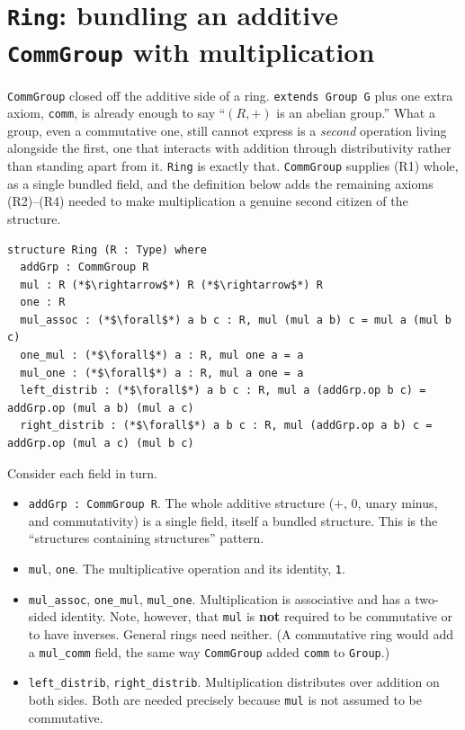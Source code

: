 \section{\texorpdfstring{\texttt{Ring}: bundling an additive \texttt{CommGroup} with multiplication}{Ring: bundling an additive CommGroup with multiplication}}\label{sec:08-rings:03-ring:1}

\texttt{CommGroup} closed off the additive side of a ring. \texttt{extends Group G} plus one extra axiom, \texttt{comm}, is already enough to say ``\((R, +)\) is an abelian group.'' What a group, even a commutative one, still cannot express is a \emph{second} operation living alongside the first, one that interacts with addition through distributivity rather than standing apart from it. \texttt{Ring} is exactly that. \texttt{CommGroup} supplies (R1) whole, as a single bundled field, and the definition below adds the remaining axioms (R2)--(R4) needed to make multiplication a genuine second citizen of the structure.

\begin{lstlisting}
structure Ring (R : Type) where
  addGrp : CommGroup R
  mul : R (*$\rightarrow$*) R (*$\rightarrow$*) R
  one : R
  mul_assoc : (*$\forall$*) a b c : R, mul (mul a b) c = mul a (mul b c)
  one_mul : (*$\forall$*) a : R, mul one a = a
  mul_one : (*$\forall$*) a : R, mul a one = a
  left_distrib : (*$\forall$*) a b c : R, mul a (addGrp.op b c) = addGrp.op (mul a b) (mul a c)
  right_distrib : (*$\forall$*) a b c : R, mul (addGrp.op a b) c = addGrp.op (mul a c) (mul b c)
\end{lstlisting}

Consider each field in turn.

\begin{itemize}
\tightlist
\item
  \texttt{addGrp : CommGroup R}. The whole additive structure (\(+\), \(0\), unary minus, and commutativity) is a single field, itself a bundled structure. This is the ``structures containing structures'' pattern.
\item
  \texttt{mul}, \texttt{one}. The multiplicative operation and its identity, \texttt{1}.
\item
  \texttt{mul\_\allowbreak{}assoc}, \texttt{one\_\allowbreak{}mul}, \texttt{mul\_\allowbreak{}one}. Multiplication is associative and has a two-sided identity. Note, however, that \texttt{mul} is \textbf{not} required to be commutative or to have inverses. General rings need neither. (A commutative ring would add a \texttt{mul\_\allowbreak{}comm} field, the same way \texttt{CommGroup} added \texttt{comm} to \texttt{Group}.)
\item
  \texttt{left\_\allowbreak{}distrib}, \texttt{right\_\allowbreak{}distrib}. Multiplication distributes over addition on both sides. Both are needed precisely because \texttt{mul} is not assumed to be commutative.
\end{itemize}

